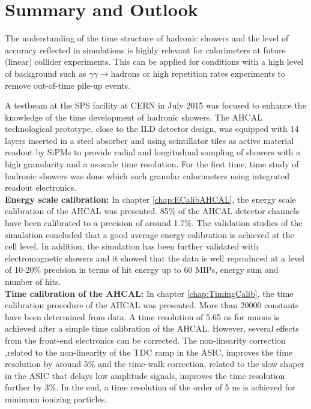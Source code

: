 \section{Summary and Outlook}

The understanding of the time structure of hadronic showers and the level of accuracy reflected in \geant simulations is highly relevant for calorimeters at future (linear) collider experiments. This can be applied for conditions with a high level of background such as $\gamma\gamma \rightarrow \text{hadrons}$ or high repetition rates experiments to remove out-of-time pile-up events.

A testbeam at the SPS facility at CERN in July 2015 was focused to enhance the knowledge of the time development of hadronic showers. The AHCAL technological prototype, close to the ILD detector design, was equipped with 14 layers inserted in a steel absorber and using scintillator tiles as active material readout by SiPMs to provide radial and longitudinal sampling of showers with a high granularity and a ns-scale time resolution. For the first time, time study of hadronic showers was done which such granular calorimeters using integrated readout electronics.\\[0.1cm]

\noindent\textbf{Energy scale calibration:} In chapter \ref{chap:ECalibAHCAL}, the energy scale calibration of the AHCAL was presented. 85\% of the AHCAL detector channels have been calibrated to a precision of around 1.7\%. The validation studies of the simulation concluded that a good average energy calibration is achieved at the cell level. In addition, the simulation has been further validated with electromagnetic showers and it showed that the data is well reproduced at a level of 10-20\% precision in terms of hit energy up to 60 MIPs, energy sum and number of hits.\\[0.1cm]

\noindent\textbf{Time calibration of the AHCAL:} In chapter \ref{chap:TimingCalib}, the time calibration procedure of the AHCAL was presented. More than 20000 constants have been determined from data. A time resolution of 5.65 ns for muons is achieved after a simple time calibration of the AHCAL. However, several effects from the front-end electronics can be corrected. The non-linearity correction ,related to the non-linearity of the TDC ramp in the ASIC, improves the time resolution by around 5\% and the time-walk correction, related to the slow shaper in the ASIC that delays low amplitude signals, improves the time resolution further by 3\%. In the end, a time resolution of the order of 5 ns is achieved for minimum ionizing particles.\\[0.1cm]

